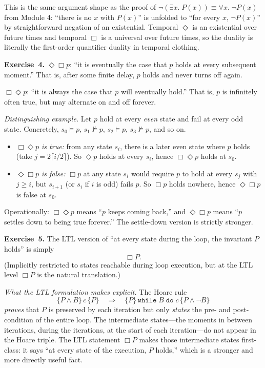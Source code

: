 \documentclass[11pt]{article}
\begin{document}
This is the same argument shape as the proof of
$\lnot (\exists x.\; P(x)) \equiv \forall x.\; \lnot P(x)$ from
Module 4: ``there is no $x$ with $P(x)$'' is unfolded to ``for every
$x$, $\lnot P(x)$'' by straightforward negation of an existential.
Temporal $\Diamond$ is an existential over future times and temporal
$\Box$ is a universal over future times, so the duality is literally
the first-order quantifier duality in temporal clothing.

\medskip
\textbf{Exercise~4.}
\emph{$\Diamond \Box p$}: ``it is eventually the case that $p$ holds
at every subsequent moment.''  That is, after some finite delay, $p$
holds and never turns off again.

\emph{$\Box \Diamond p$}: ``it is always the case that $p$ will
eventually hold.''  That is, $p$ is infinitely often true, but may
alternate on and off forever.

\emph{Distinguishing example.}  Let $p$ hold at every \emph{even}
state and fail at every odd state.  Concretely,
$s_0 \models p$, $s_1 \not\models p$, $s_2 \models p$, $s_3
\not\models p$, and so on.

\begin{itemize}
  \item \emph{$\Box \Diamond p$ is true:} from any state $s_i$, there
        is a later even state where $p$ holds (take $j = 2 \lceil
        i/2 \rceil$).  So $\Diamond p$ holds at every $s_i$, hence
        $\Box \Diamond p$ holds at $s_0$.

  \item \emph{$\Diamond \Box p$ is false:} $\Box p$ at any state $s_i$
        would require $p$ to hold at every $s_j$ with $j \geq i$, but
        $s_{i+1}$ (or $s_i$ if $i$ is odd) fails $p$.  So $\Box p$
        holds nowhere, hence $\Diamond \Box p$ is false at $s_0$.
\end{itemize}

Operationally: $\Box \Diamond p$ means ``$p$ keeps coming back,'' and
$\Diamond \Box p$ means ``$p$ settles down to being true forever.''
The settle-down version is strictly stronger.

\medskip
\textbf{Exercise~5.}
The LTL version of ``at every state during the loop, the invariant $P$
holds'' is simply
\[
  \Box P.
\]
(Implicitly restricted to states reachable during loop execution, but
at the LTL level $\Box P$ is the natural translation.)

\emph{What the LTL formulation makes explicit.}  The Hoare rule
\[
  \{P \wedge B\}\, c\, \{P\} \quad \Longrightarrow \quad
  \{P\}\, \mathtt{while}\; B\; \mathtt{do}\; c\, \{P \wedge \lnot B\}
\]
\emph{proves} that $P$ is preserved by each iteration but only
\emph{states} the pre- and post-condition of the entire loop.  The
intermediate states---the moments in between iterations, during the
iterations, at the start of each iteration---do not appear in the
Hoare triple.  The LTL statement $\Box P$ makes those intermediate
states first-class: it says ``at every state of the execution, $P$
holds,'' which is a stronger and more directly useful fact.
\end{document}
